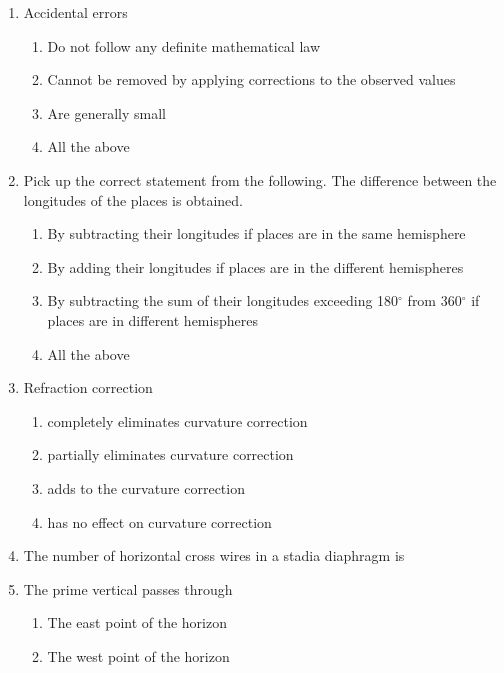 \documentclass[11pt,a4paper]{article}
\begin{document}
\begin{enumerate}
\item{Accidental errors}
\begin{enumerate}[label=\Alph*.]
\item{Do not follow any definite mathematical law}
\item{Cannot be removed by applying corrections to the observed values}
\item{Are generally small}
\item{All the above}
\end{enumerate}
\item{Pick up the correct statement from the following. The difference between the longitudes of the places is obtained.}
\begin{enumerate}[label=\Alph*.]
\item{By subtracting their longitudes if places are in the same hemisphere}
\item{By adding their longitudes if places are in the different hemispheres}
\item{By subtracting the sum of their longitudes exceeding 180$^\circ$ from 360$^\circ$ if places are in different hemispheres}
\item{All the above}
\end{enumerate}
\item{Refraction correction}
\begin{enumerate}[label=\Alph*.]
\item{completely eliminates curvature correction}
\item{partially eliminates curvature correction}
\item{adds to the curvature correction}
\item{has no effect on curvature correction}
\end{enumerate}
\item{The number of horizontal cross wires in a stadia diaphragm is}
\\
\item{The prime vertical passes through}
\begin{enumerate}[label=\Alph*.]
\item{The east point of the horizon}
\item{The west point of the horizon}

\end{enumerate}
\end{enumerate}
\end{document}
